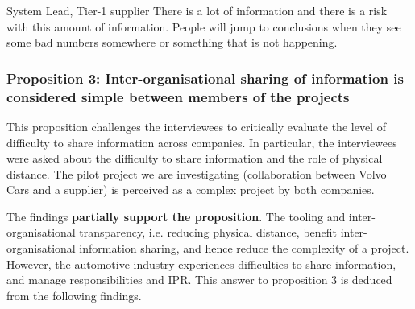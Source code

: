 \begin{aquote}{System Lead, Tier-1 supplier}
There is a lot of information and there is a risk with this amount of information. People will jump to conclusions when they see some bad numbers somewhere or something that is not happening.
\end{aquote}


%


\vspace{.2cm}
\subsubsection{Proposition 3: Inter-organisational sharing of information is considered simple between members of the projects}

This proposition challenges the interviewees to critically evaluate the level of difficulty to share information across companies. In particular, the interviewees were asked about the difficulty to share information and the role of physical distance. The pilot project we are investigating (collaboration between Volvo Cars and a supplier) is perceived as a complex project by both companies. %

The findings {\bf partially support the proposition}. The tooling and inter-organisational transparency, i.e. reducing physical distance, benefit inter-organisational information sharing, and hence reduce the complexity of a project. However, the automotive industry experiences difficulties to share information, and manage responsibilities and IPR. This answer to proposition 3 is deduced from the following findings.

